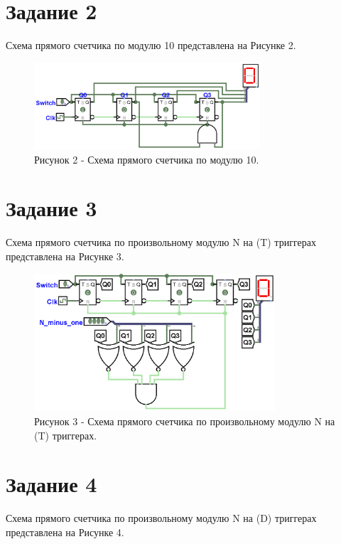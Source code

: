 \documentclass[oneside,a4paper,14pt]{extarticle}
\begin{document}
\newpage

\section*{Задание 2}
Схема прямого счетчика по модулю 10 представлена на Рисунке 2.\\

\begin{figure}[h!]
	\centering
	\includegraphics[width=0.75\textwidth]{pics/2.png}
	\caption*{Рисунок 2 - Схема прямого счетчика по модулю 10.}
\end{figure}
\newpage

\section*{Задание 3}
Схема прямого счетчика по произвольному модулю N на (T) триггерах представлена на Рисунке 3.\\

\begin{figure}[h!]
	\centering
	\includegraphics[width=0.8\textwidth]{pics/3.png}
	\caption*{Рисунок 3 - Схема прямого счетчика по произвольному модулю N на (T) триггерах.}
\end{figure}
\newpage

\section*{Задание 4}

Схема прямого счетчика по произвольному модулю N на (D) триггерах представлена на Рисунке 4.\\
\end{document}
